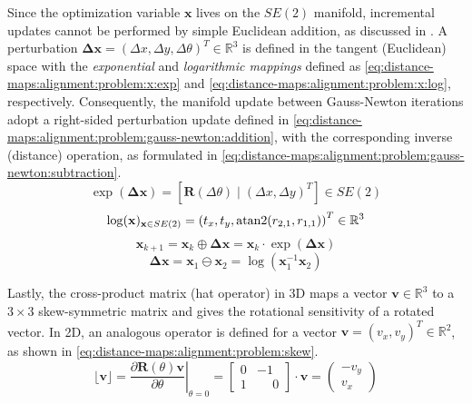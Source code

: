 Since the optimization variable $\mathbf{x}$ lives on the $SE(2)$ manifold,
incremental updates cannot be performed by simple Euclidean addition,
as discussed in .
A perturbation
$\mathbf{\Delta x} = (\Delta x, \Delta y, \Delta\theta)^T \in \mathbb{R}^3$ is
defined in the tangent (Euclidean) space with the \emph{exponential} and
\emph{logarithmic mappings} defined as
\eqref{eq:distance-maps:alignment:problem:x:exp} and
\eqref{eq:distance-maps:alignment:problem:x:log}, respectively.
Consequently, the manifold update between Gauss-Newton iterations adopt a
right-sided perturbation update defined in
\eqref{eq:distance-maps:alignment:problem:gauss-newton:addition}, with the
corresponding inverse (distance) operation, as formulated in
\eqref{eq:distance-maps:alignment:problem:gauss-newton:subtraction}.
\begin{equation}
\label{eq:distance-maps:alignment:problem:x:exp}
\exp\!\left(\mathbf{\Delta x}\right) =
\left[\mathbf{R}(\Delta\theta) \mid (\Delta x, \Delta y)^T \right] \in SE(2)
\end{equation}
\begin{equation}
\label{eq:distance-maps:alignment:problem:x:log}
\log(\mathbf{x})_{\mathbf{x} \in SE(2)} =
    \left(t_x,t_y,\atan2\!\left(r_{2,1}, r_{1,1}\right)\right)^T
    \in \mathbb{R}^3
\end{equation}
\begin{equation}
\label{eq:distance-maps:alignment:problem:gauss-newton:addition}
\mathbf{x}_{k+1} = \mathbf{x}_k \oplus \mathbf{\Delta x}
                 = \mathbf{x}_k \cdot \exp\!\left(\mathbf{\Delta x}\right)
\end{equation}
\begin{equation}
\label{eq:distance-maps:alignment:problem:gauss-newton:subtraction}
\mathbf{\Delta x} = \mathbf{x}_1 \ominus \mathbf{x}_2
                 = \log\!\left(\mathbf{x}_1^{-1} \mathbf{x}_2\right)
\end{equation}

Lastly, the cross-product matrix (hat operator) in 3D maps a vector
$\mathbf{v} \in \mathbb{R}^3$ to a $3\times 3$ skew-symmetric matrix and gives
the rotational sensitivity of a rotated vector. In 2D, an analogous operator
is defined for a vector $\mathbf{v} = (v_x, v_y)^T \in \mathbb{R}^2$, as shown
in \eqref{eq:distance-maps:alignment:problem:skew}.
\begin{equation}
\label{eq:distance-maps:alignment:problem:skew}
\lfloor \mathbf{v} \rfloor =
\left.\frac{\partial\mathbf{R}(\theta)\mathbf{v}}{\partial \theta}
\right|_{\theta=0} =
\begin{bmatrix} 0 & -1 \\ 1 & \phantom{-}0 \end{bmatrix} \cdot \mathbf{v} =
\begin{pmatrix} -v_y \\ v_x \end{pmatrix}
\end{equation}

